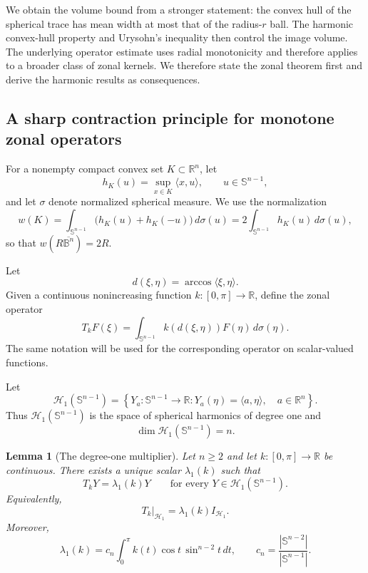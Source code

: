 \documentclass[11pt,reqno]{amsart}
\newtheorem{lemma}[theorem]{Lemma}
\theoremstyle{remark}
\begin{document}
We obtain the volume bound from a stronger statement: the convex hull of
the spherical trace has mean width at most that of the radius-$r$ ball.
The harmonic convex-hull property and Urysohn's inequality then control
the image volume.  The underlying operator estimate uses radial monotonicity and therefore
applies to a broader class of zonal kernels.
We therefore state the zonal theorem first and derive the harmonic
results as consequences.

\subsection{A sharp contraction principle for monotone zonal operators}

For a nonempty compact convex set $K\subset\mathbb R^n$, let
\[
 h_K(u)=\sup_{x\in K}\langle x,u\rangle,
 \qquad u\in\mathbb S^{n-1},
\]
and let $\sigma$ denote normalized spherical measure.  We use the
normalization
\begin{equation}\label{eq:introMeanWidth}
 w(K)
 =
 \int_{\mathbb S^{n-1}}
 \bigl(h_K(u)+h_K(-u)\bigr)\,d\sigma(u)
 =
 2\int_{\mathbb S^{n-1}}h_K(u)\,d\sigma(u),
\end{equation}
so that $w(R\overline{\mathbb B^n})=2R$.

Let
\[
 d(\xi,\eta)=\arccos\langle\xi,\eta\rangle.
\]
Given a continuous nonincreasing function
$k:[0,\pi]\to\mathbb R$, define the zonal operator
\[
 T_kF(\xi)
 =
 \int_{\mathbb S^{n-1}}
 k(d(\xi,\eta))F(\eta)\,d\sigma(\eta).
\]
The same notation will be used for the corresponding operator on
scalar-valued functions.

Let
\[
 \mathcal H_1(\mathbb S^{n-1})
 =
 \left\{
 Y_a:\mathbb S^{n-1}\to\mathbb R:
 Y_a(\eta)=\langle a,\eta\rangle,\quad a\in\mathbb R^n
 \right\}.
\]
Thus $\mathcal H_1(\mathbb S^{n-1})$ is the space of spherical
harmonics of degree one and
\[
 \dim \mathcal H_1(\mathbb S^{n-1})=n.
\]

\begin{lemma}[The degree-one multiplier]
\label{lem:degree-one-multiplier}
Let $n\ge2$ and let $k:[0,\pi]\to\mathbb R$ be continuous.  There exists
a unique scalar $\lambda_1(k)$ such that
\[
 T_kY=\lambda_1(k)Y
 \qquad
 \text{for every }Y\in\mathcal H_1(\mathbb S^{n-1}).
\]
Equivalently,
\[
 T_k|_{\mathcal H_1}
 =
 \lambda_1(k)I_{\mathcal H_1}.
\]
Moreover,
\begin{equation}\label{eq:intro-lambda1}
 \lambda_1(k)
 =
 c_n\int_0^\pi
 k(t)\cos t\,\sin^{n-2}t\,dt,
 \qquad
 c_n=\frac{|\mathbb S^{n-2}|}{|\mathbb S^{n-1}|}.
\end{equation}
\end{lemma}
\end{document}
